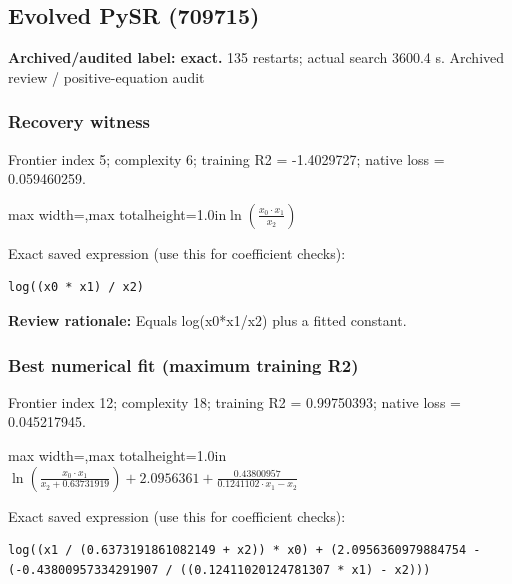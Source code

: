 \documentclass[10pt,letterpaper,landscape]{article}
\begin{document}
\begin{minipage}[t]{0.485\textwidth}
\subsection*{Evolved PySR (709715)}
\textbf{Archived/audited label: exact.} 135 restarts; actual search 3600.4 s.
{\small Archived review / positive-equation audit}
\subsubsection*{Recovery witness}
Frontier index 5; complexity 6; training R2 = -1.4029727; native loss = 0.059460259.
\begin{center}\begin{adjustbox}{max width=\linewidth,max totalheight=1.0in}$\displaystyle \ln{\left(\frac{x_{0} \cdot x_{1}}{x_{2}} \right)}$\end{adjustbox}\end{center}
{\scriptsize Exact saved expression (use this for coefficient checks):}
\begin{lstlisting}
log((x0 * x1) / x2)
\end{lstlisting}
{\small\textbf{Review rationale:} Equals log(x0*x1/x2) plus a fitted constant.}
\subsubsection*{Best numerical fit (maximum training R2)}
Frontier index 12; complexity 18; training R2 = 0.99750393; native loss = 0.045217945.
\begin{center}\begin{adjustbox}{max width=\linewidth,max totalheight=1.0in}$\displaystyle \ln{\left(\frac{x_{0} \cdot x_{1}}{x_{2} + 0.63731919} \right)} + 2.0956361 + \frac{0.43800957}{0.1241102 \cdot x_{1} - x_{2}}$\end{adjustbox}\end{center}
{\scriptsize Exact saved expression (use this for coefficient checks):}
\begin{lstlisting}
log((x1 / (0.6373191861082149 + x2)) * x0) + (2.0956360979884754 - (-0.43800957334291907 / ((0.12411020124781307 * x1) - x2)))
\end{lstlisting}
\end{minipage}
\clearpage{}\label{kepler-10000}
\end{document}
